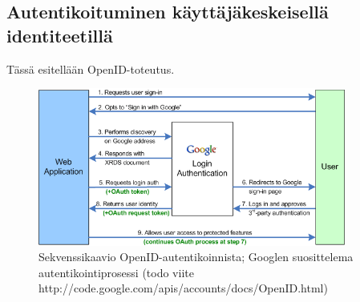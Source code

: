 \documentclass[finnish,gradu]{tktltiki}
\begin{document}

  \subsection{Autentikoituminen käyttäjäkeskeisellä identiteetillä} %
  \label{sub:autentikoituminen_käyttäjäkeskeisellä_identiteetillä}

  Tässä esitellään OpenID-toteutus.

  \begin{figure}
    \centering
    \includegraphics[width=0.9\textwidth]{images/google_openid_diagram.png}
    \caption{Sekvenssikaavio OpenID-autentikoinnista; Googlen suosittelema autentikointiprosessi (todo viite http://code.google.com/apis/accounts/docs/OpenID.html)}
    \label{fig:sekvenssikaavio_google_openid}
  \end{figure}
\end{document}
